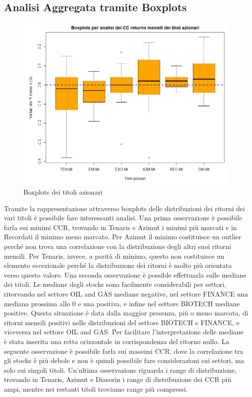 \documentclass[12pt]{article}
\begin{document}
\subsection{Analisi Aggregata tramite Boxplots}
\begin{figure}[!htb]
    \centering
    \includegraphics[width=1\textwidth]{immagini/boxplots.png}
    \caption{Boxplots dei titoli azionari}
\end{figure}
\FloatBarrier
Tramite la rappresentazione attraverso boxplots delle distribuzioni dei ritorni dei vari titoli è possibile fare interessanti analisi. Una prima osservazione è possibile farla sui minimi CCR, trovando in Tenaris e Azimut i minimi più marcati e in Recordati il minimo meno marcato. Per Azimut il minimo costituisce un outlier perché non trova una correlazione con la distribuzione degli altri suoi ritorni mensili. Per Tenaris, invece, a parità di minimo, questo non costituisce un elemento eccezionale perché la distribuzione dei ritorni è molto più orientata verso questo valore. Una seconda osservazione è possible effettuarla sulle mediane dei titoli. Le mediane degli stocks sono facilmente considerabili per settori, ritorvando nel settore OIL and GAS mediane negative, nel settore FINANCE una mediana prossima allo 0 e una positiva, e infine nel settore BIOTECH mediane positive. Questa situazione è data dalla maggior presenza, più o meno marcata, di ritorni mensili positivi nelle distribuzioni del settore BIOTECH e FINANCE, e viceversa nel settore OIL and GAS. Per facilitare l'interpretazione delle mediane è stata inserita una retta orizzontale in corrispondenza del ritorno nullo. La seguente osservazione è possibile farla sui massimi CCR, dove la correlazione tra gli stocks è più debole e non è quindi possibile fare considerazioni sui settori, ma solo sui singoli titoli. Un'ultima osservazione riguarda i range di distribuzione, trovando in Tenaris, Azimut e Diasorin i range di distribuzione dei CCR più ampi, mentre nei restanti titoli troviamo range più compressi.
\newpage
\end{document}
